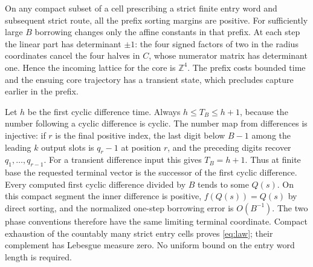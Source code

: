 \documentclass[11pt,reqno]{amsart}
\newcommand{\ZZ}{\mathbb Z}
\begin{document}
On any compact subset of a cell prescribing a strict finite entry word and
subsequent strict route, all the prefix sorting margins are positive.
For sufficiently large $B$ borrowing changes only the affine constants
in that prefix. At each step the linear part has determinant $\pm1$:
the four signed factors of two in the radius coordinates cancel the four
halves in $C$, whose numerator matrix has determinant one. Hence the
incoming lattice for the core is $\ZZ^4$. The prefix costs bounded time and
the ensuing core trajectory has a transient state, which precludes capture
earlier in the prefix.

Let $h$ be the first cyclic difference time. Always $h\le T_B\le h+1$,
because the number following a cyclic difference is cyclic. The number
map from differences is injective: if $r$ is the final positive index,
the last digit below $B-1$ among the leading $k$ output slots is $q_r-1$
at position $r$, and the preceding digits recover $q_1,\ldots,q_{r-1}$.
For a transient difference input this gives $T_B=h+1$. Thus at finite base
the requested terminal vector is the successor of the first cyclic difference.
Every computed first cyclic difference divided by $B$ tends to some $Q(s)$.
On this compact segment the inner difference is positive, $f(Q(s))=Q(s)$
by direct sorting, and the normalized one-step borrowing error is $O(B^{-1})$.
The two phase conventions therefore have the same limiting terminal
coordinate. Compact exhaustion of the countably many strict entry cells
proves \eqref{eq:law}; their complement has Lebesgue measure zero.
No uniform bound on the entry word length is required.
\end{document}
